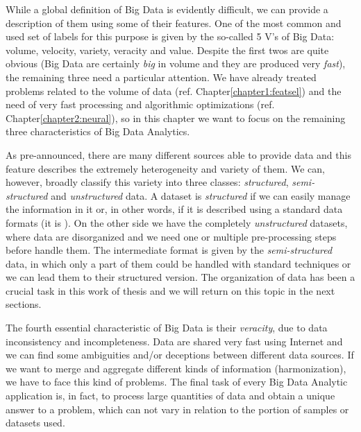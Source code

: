 \documentclass{standalone}
\begin{document}
While a global definition of Big Data is evidently difficult, we can provide a description of them using some of their  features.
One of the most common and used set of labels for this purpose is given by the so-called 5 V's of Big Data: volume, velocity, variety, veracity and value.
Despite the first twos are quite obvious (Big Data are certainly \emph{big} in volume and they are produced very \emph{fast}), the remaining three need a particular attention.
We have already treated problems related to the volume of data (ref. Chapter\ref{chapter1:featsel}) and the need of very fast processing and algorithmic optimizations (ref. Chapter\ref{chapter2:neural}), so in this chapter we want to focus on the remaining three characteristics of Big Data Analytics.

As pre-announced, there are many different sources able to provide data and this feature describes the extremely heterogeneity and variety of them.
We can, however, broadly classify this variety into three classes: \emph{structured}, \emph{semi-structured} and \emph{unstructured} data.
A dataset is \emph{structured} if we can easily manage the information in it or, in other words, if it is described using a standard data formats (it is ).
On the other side we have the completely \emph{unstructured} datasets, where data are disorganized and we need one or multiple pre-processing steps before handle them.
The intermediate format is given by the \emph{semi-structured} data, in which only a part of them could be handled with standard techniques or we can lead them to their structured version.
The organization of data has been a crucial task in this work of thesis and we will return on this topic in the next sections.

The fourth essential characteristic of Big Data is their \emph{veracity}, due to data inconsistency and incompleteness.
Data are shared very fast using Internet and we can find some ambiguities and/or deceptions between different data sources.
If we want to merge and aggregate different kinds of information (harmonization), we have to face this kind of problems.
The final task of every Big Data Analytic application is, in fact, to process large quantities of data and obtain a unique answer to a problem, which can not vary in relation to the portion of samples or datasets used.
\end{document}
